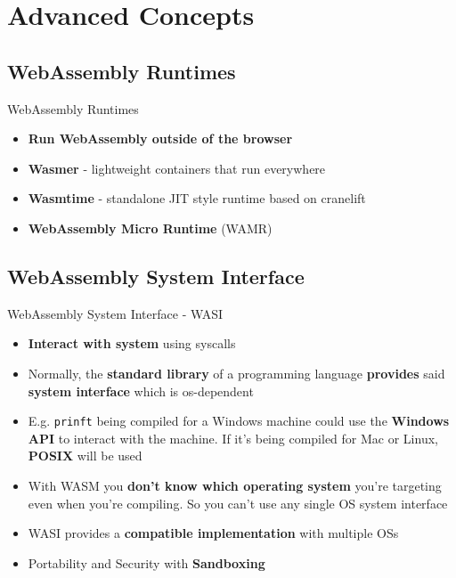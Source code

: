 \documentclass{beamer}
\begin{document}
\section{Advanced Concepts}

\subsection{WebAssembly Runtimes}

\begin{frame}{WebAssembly Runtimes}
    \begin{itemize}
        \item \textbf{Run WebAssembly outside of the browser}
        \item \textbf{Wasmer} - lightweight containers that run everywhere
        \item \textbf{Wasmtime} - standalone JIT style runtime based on cranelift
        \item \textbf{WebAssembly Micro Runtime} (WAMR)
    \end{itemize}
\end{frame}

\subsection{WebAssembly System Interface}

\begin{frame}{WebAssembly System Interface - WASI}
\begin{itemize} 
    \item \textbf{Interact with system} using syscalls
    \item Normally, the \textbf{standard library} of a programming language \textbf{provides} said \textbf{system interface} which is os-dependent
    \item E.g. \lstinline{prinft} being compiled for a Windows machine could use the \textbf{Windows API} to interact with the machine. If it's being compiled for Mac or Linux, \textbf{POSIX} will be used
    \item With WASM you \textbf{don't know which operating system} you're targeting even when you're compiling. So you can't use any single OS system interface 
    \item WASI provides a \textbf{compatible implementation} with multiple OSs
    \item Portability and Security with \textbf{Sandboxing}
\end{itemize}
\end{frame}
\end{document}
